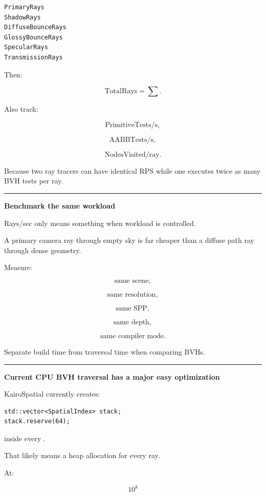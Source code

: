 \begin{verbatim}
PrimaryRays
ShadowRays
DiffuseBounceRays
GlossyBounceRays
SpecularRays
TransmissionRays
\end{verbatim}

Then:

\[
\text{TotalRays}
=
\sum.
\]

Also track:

\[
\text{PrimitiveTests/s},
\]

\[
\text{AABBTests/s},
\]

\[
\text{NodesVisited/ray}.
\]

Because two ray tracers can have identical RPS while one executes twice as many BVH tests per ray.

\begin{center}\rule{0.5\linewidth}{0.5pt}\end{center}

\textbf{Benchmark the same workload}

Rays/sec only means something when workload is controlled.

A primary camera ray through empty sky is far cheaper than a diffuse path ray through dense geometry.

Measure:

\[
\text{same scene},
\]

\[
\text{same resolution},
\]

\[
\text{same SPP},
\]

\[
\text{same depth},
\]

\[
\text{same compiler mode}.
\]

Separate build time from traversal time when comparing BVHs.

\begin{center}\rule{0.5\linewidth}{0.5pt}\end{center}

\textbf{Current CPU BVH traversal has a major easy optimization}

KairoSpatial currently creates:

\begin{verbatim}
std::vector<SpatialIndex> stack;
stack.reserve(64);
\end{verbatim}

inside every .

That likely means a heap allocation for every ray.

At:

\[
10^8
\]

